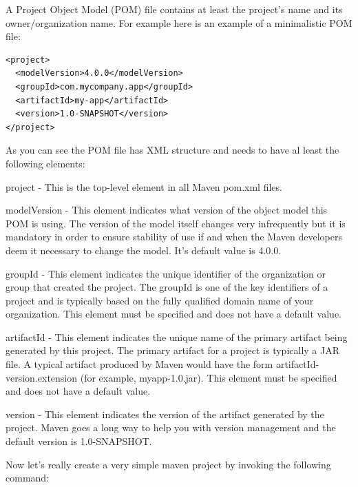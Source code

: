 \documentclass{article}
\begin{document}
A Project Object Model (POM) file contains at least the project's name
and its owner/organization name. For example here is an example of a
minimalistic POM file:


\begin{lstlisting}
<project>
  <modelVersion>4.0.0</modelVersion>
  <groupId>com.mycompany.app</groupId>
  <artifactId>my-app</artifactId>
  <version>1.0-SNAPSHOT</version>
</project>
\end{lstlisting}

As you can see  the POM file has XML structure and needs to have al
least the following elements:

\begin{compactitem}

\item project -  This is the top-level element in all Maven pom.xml files.

\item modelVersion -  This element indicates what version of the object
  model this POM is using. The version of the model itself changes
  very infrequently but it is mandatory in order to ensure stability
  of use if and when the Maven developers deem it necessary to change
  the model. It's default value is 4.0.0. 

\item groupId - This element indicates the unique identifier of the
  organization or group that created the project. The groupId is one
  of the key identifiers of a project and is typically based on the
  fully qualified domain name of your organization.
  This element must be specified and does not have a default value.

\item artifactId -  This element indicates the unique name of the
  primary artifact being generated by this project. The primary
  artifact for a project is typically a JAR file. A typical artifact
  produced by Maven would have the form artifactId-version.extension
  (for example, myapp-1.0.jar).
  This element must be specified and does not have a default value.

\item version - This element indicates the version of the artifact
  generated by the project. Maven goes a long way to help you with
  version management and the default version is 1.0-SNAPSHOT.

\end{compactitem}

Now let's really create a very simple maven project by invoking the
following command:
\end{document}
